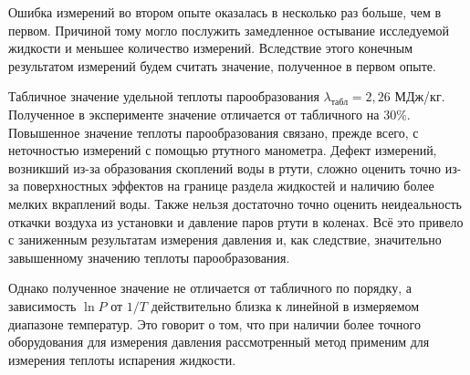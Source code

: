 \documentclass[a4paper,12pt]{article} %
\begin{document}
Ошибка измерений во втором опыте оказалась в несколько раз больше, чем в первом. Причиной тому могло послужить замедленное остывание исследуемой жидкости и меньшее количество измерений. Вследствие этого конечным результатом измерений будем считать значение, полученное в первом опыте.

Табличное значение удельной теплоты парообразования $\lambda_\text{табл} = 2,26$ МДж/кг. Полученное в эксперименте значение отличается от табличного на 30\%. Повышенное значение теплоты парообразования связано, прежде всего, с неточностью измерений с помощью ртутного манометра. Дефект измерений, возникший из-за образования скоплений воды в ртути, сложно оценить точно из-за поверхностных эффектов на границе раздела жидкостей и наличию более мелких вкраплений воды. Также нельзя достаточно точно оценить неидеальность откачки воздуха из установки и давление паров ртути в коленах. Всё это привело с заниженным результатам измерения давления и, как следствие, значительно завышенному значению теплоты парообразования. 

Однако полученное значение не отличается от табличного по порядку, а зависимость $\ln P$ от $1/T$ действительно близка к линейной в измеряемом диапазоне температур. Это говорит о том, что при наличии более точного оборудования для измерения давления рассмотренный метод применим для измерения теплоты испарения жидкости.
\end{document}
